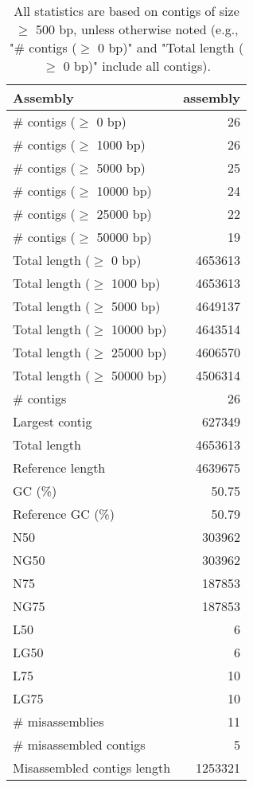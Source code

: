 \documentclass[12pt,a4paper]{article}
\begin{document}
\begin{table}[ht]
\begin{center}
\caption{All statistics are based on contigs of size $\geq$ 500 bp, unless otherwise noted (e.g., "\# contigs ($\geq$ 0 bp)" and "Total length ($\geq$ 0 bp)" include all contigs).}
\begin{tabular}{|l*{1}{|r}|}
\hline
Assembly & assembly \\ \hline
\# contigs ($\geq$ 0 bp) & 26 \\ \hline
\# contigs ($\geq$ 1000 bp) & 26 \\ \hline
\# contigs ($\geq$ 5000 bp) & 25 \\ \hline
\# contigs ($\geq$ 10000 bp) & 24 \\ \hline
\# contigs ($\geq$ 25000 bp) & 22 \\ \hline
\# contigs ($\geq$ 50000 bp) & 19 \\ \hline
Total length ($\geq$ 0 bp) & 4653613 \\ \hline
Total length ($\geq$ 1000 bp) & 4653613 \\ \hline
Total length ($\geq$ 5000 bp) & 4649137 \\ \hline
Total length ($\geq$ 10000 bp) & 4643514 \\ \hline
Total length ($\geq$ 25000 bp) & 4606570 \\ \hline
Total length ($\geq$ 50000 bp) & 4506314 \\ \hline
\# contigs & 26 \\ \hline
Largest contig & 627349 \\ \hline
Total length & 4653613 \\ \hline
Reference length & 4639675 \\ \hline
GC (\%) & 50.75 \\ \hline
Reference GC (\%) & 50.79 \\ \hline
N50 & 303962 \\ \hline
NG50 & 303962 \\ \hline
N75 & 187853 \\ \hline
NG75 & 187853 \\ \hline
L50 & 6 \\ \hline
LG50 & 6 \\ \hline
L75 & 10 \\ \hline
LG75 & 10 \\ \hline
\# misassemblies & 11 \\ \hline
\# misassembled contigs & 5 \\ \hline
Misassembled contigs length & 1253321 \\ \hline

\end{tabular}
\end{center}
\end{table}
\end{document}
